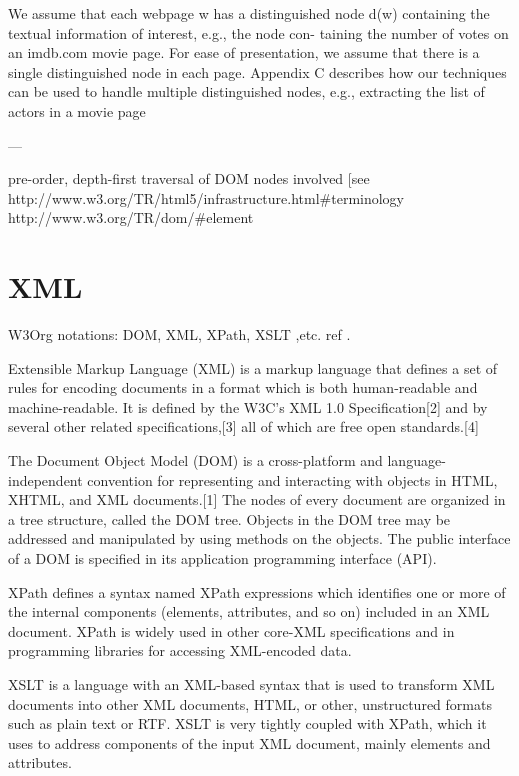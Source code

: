 We assume that each webpage w has a distinguished node d(w) containing the textual information of interest, e.g., the node con- taining the number of votes on an imdb.com movie page. For ease of presentation, we assume that there is a single distinguished node in each page. Appendix C describes how our techniques can be used to handle multiple distinguished nodes, e.g., extracting the list of actors in a movie page

---

pre-order, depth-first traversal of DOM nodes involved [see 
http://www.w3.org/TR/html5/infrastructure.html\#terminology
http://www.w3.org/TR/dom/\#element


\section{XML}

W3Org notations: DOM, XML, XPath, XSLT ,etc. ref \cite{Myllymaki02robustweb}.

Extensible Markup Language (XML) is a markup language that defines a set of rules for encoding documents in a format which is both human-readable and machine-readable. It is defined by the W3C's XML 1.0 Specification[2] and by several other related specifications,[3] all of which are free open standards.[4]

The Document Object Model (DOM) is a cross-platform and language-independent convention for representing and interacting with objects in HTML, XHTML, and XML documents.[1] The nodes of every document are organized in a tree structure, called the DOM tree. Objects in the DOM tree may be addressed and manipulated by using methods on the objects. The public interface of a DOM is specified in its application programming interface (API).

XPath defines a syntax named XPath expressions which identifies one or more of the internal components (elements, attributes, and so on) included in an XML document. XPath is widely used in other core-XML specifications and in programming libraries for accessing XML-encoded data.

XSLT is a language with an XML-based syntax that is used to transform XML documents into other XML documents, HTML, or other, unstructured formats such as plain text or RTF. XSLT is very tightly coupled with XPath, which it uses to address components of the input XML document, mainly elements and attributes.


